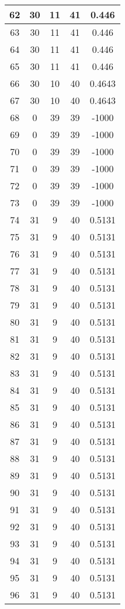 \documentclass[letterpaper, 12pt]{article}
\begin{document}
\begin{longtable}{|c|c|c|c|c|}
\hline
62 & 30 & 11 & 41 & 0.446 \\
\hline
63 & 30 & 11 & 41 & 0.446 \\
\hline
64 & 30 & 11 & 41 & 0.446 \\
\hline
65 & 30 & 11 & 41 & 0.446 \\
\hline
66 & 30 & 10 & 40 & 0.4643 \\
\hline
67 & 30 & 10 & 40 & 0.4643 \\
\hline
68 & 0 & 39 & 39 & -1000 \\
\hline
69 & 0 & 39 & 39 & -1000 \\
\hline
70 & 0 & 39 & 39 & -1000 \\
\hline
71 & 0 & 39 & 39 & -1000 \\
\hline
72 & 0 & 39 & 39 & -1000 \\
\hline
73 & 0 & 39 & 39 & -1000 \\
\hline
74 & 31 & 9 & 40 & 0.5131 \\
\hline
75 & 31 & 9 & 40 & 0.5131 \\
\hline
76 & 31 & 9 & 40 & 0.5131 \\
\hline
77 & 31 & 9 & 40 & 0.5131 \\
\hline
78 & 31 & 9 & 40 & 0.5131 \\
\hline
79 & 31 & 9 & 40 & 0.5131 \\
\hline
80 & 31 & 9 & 40 & 0.5131 \\
\hline
81 & 31 & 9 & 40 & 0.5131 \\
\hline
82 & 31 & 9 & 40 & 0.5131 \\
\hline
83 & 31 & 9 & 40 & 0.5131 \\
\hline
84 & 31 & 9 & 40 & 0.5131 \\
\hline
85 & 31 & 9 & 40 & 0.5131 \\
\hline
86 & 31 & 9 & 40 & 0.5131 \\
\hline
87 & 31 & 9 & 40 & 0.5131 \\
\hline
88 & 31 & 9 & 40 & 0.5131 \\
\hline
89 & 31 & 9 & 40 & 0.5131 \\
\hline
90 & 31 & 9 & 40 & 0.5131 \\
\hline
91 & 31 & 9 & 40 & 0.5131 \\
\hline
92 & 31 & 9 & 40 & 0.5131 \\
\hline
93 & 31 & 9 & 40 & 0.5131 \\
\hline
94 & 31 & 9 & 40 & 0.5131 \\
\hline
95 & 31 & 9 & 40 & 0.5131 \\
\hline
96 & 31 & 9 & 40 & 0.5131 \\

\end{longtable}
\end{document}
